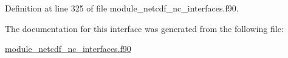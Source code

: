 Definition at line 325 of file module\+\_\+netcdf\+\_\+nc\+\_\+interfaces.\+f90.



The documentation for this interface was generated from the following file\+:\begin{DoxyCompactItemize}
\item 
\hyperlink{module__netcdf__nc__interfaces_8f90}{module\+\_\+netcdf\+\_\+nc\+\_\+interfaces.\+f90}\end{DoxyCompactItemize}
